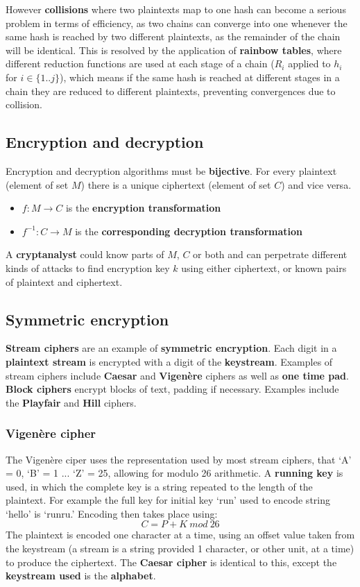 \documentclass[final]{article}
\newcommand{\np}{\vspace{8pt} \\}
\begin{document}
However \textbf{collisions} where two plaintexts map to one hash can become a serious problem in terms of efficiency, as two chains can converge into one whenever the same hash is reached by two different plaintexts, as the remainder of the chain will be identical. This is resolved by the application of \textbf{rainbow tables}, where different reduction functions are used at each stage of a chain ($ R_{i} $ applied to $ h_{i} $ for $ i \in \{1..j\} $), which means if the same hash is reached at different stages in a chain they are reduced to different plaintexts, preventing convergences due to collision.

\subsection{Encryption and decryption}
Encryption and decryption algorithms must be \textbf{bijective}. For every plaintext (element of set $ M $) there is a unique ciphertext (element of set $ C $) and vice versa.
\begin{itemize}
	\item $ f : M \rightarrow C $ is the \textbf{encryption transformation}
	\item $ f^{-1} : C \rightarrow M $ is the \textbf{corresponding decryption transformation}
\end{itemize}
A \textbf{cryptanalyst} could know parts of $ M $, $ C $ or both and can perpetrate different kinds of attacks to find encryption key $ k $ using either ciphertext, or known pairs of plaintext and ciphertext.

\subsection{Symmetric encryption}
\textbf{Stream ciphers} are an example of \textbf{symmetric encryption}. Each digit in a \textbf{plaintext stream} is encrypted with a digit of the \textbf{keystream}. Examples of stream ciphers include \textbf{Caesar} and \textbf{Vigen\`{e}re} ciphers as well as \textbf{one time pad}. \np
\textbf{Block ciphers} encrypt blocks of text, padding if necessary. Examples include the \textbf{Playfair} and \textbf{Hill} ciphers.

\subsubsection{Vigen\`{e}re cipher}
The Vigen\`{e}re ciper uses the representation used by most stream ciphers, that `A' = 0, `B' = 1 ... `Z' = 25, allowing for modulo 26 arithmetic. A \textbf{running key} is used, in which the complete key is a string repeated to the length of the plaintext. For example the full key for initial key `run' used to encode string `hello' is `runru.' Encoding then takes place using:
\[
	C = P + K\ mod\ 26
\]
The plaintext is encoded one character at a time, using an offset value taken from the keystream (a stream is a string provided 1 character, or other unit, at a time) to produce the ciphertext. The \textbf{Caesar cipher} is identical to this, except the \textbf{keystream used} is the \textbf{alphabet}.
\end{document}
